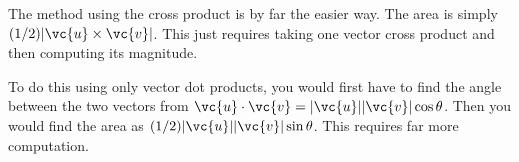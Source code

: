The method using the cross product is by far the easier way.
The area is simply $(1/2)|\vc{u}\times\vc{v}|$. This just
requires taking one vector cross product and then computing its
magnitude.

To do this using only vector dot products, you would first
have to find the angle between the two vectors from
$\vc{u}\cdot\vc{v}=|\vc{u}||\vc{v}|\cos\theta$. Then you
would find the area as $(1/2)|\vc{u}||\vc{v}|\sin\theta$.
This requires far more computation.
